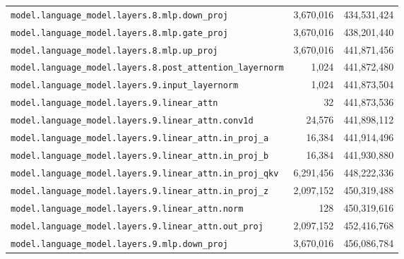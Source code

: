 \documentclass[10pt,a4paper]{article}
\theoremstyle{definition}
\begin{document}
\begin{appendices}
\begin{longtable}{p{9.5cm}rr}
\texttt{model.\allowbreak{}language\_model.\allowbreak{}layers.\allowbreak{}8.\allowbreak{}mlp.\allowbreak{}down\_proj} & 3,670,016 & 434,531,424 \\
\texttt{model.\allowbreak{}language\_model.\allowbreak{}layers.\allowbreak{}8.\allowbreak{}mlp.\allowbreak{}gate\_proj} & 3,670,016 & 438,201,440 \\
\texttt{model.\allowbreak{}language\_model.\allowbreak{}layers.\allowbreak{}8.\allowbreak{}mlp.\allowbreak{}up\_proj} & 3,670,016 & 441,871,456 \\
\texttt{model.\allowbreak{}language\_model.\allowbreak{}layers.\allowbreak{}8.\allowbreak{}post\_attention\_layernorm} & 1,024 & 441,872,480 \\
\texttt{model.\allowbreak{}language\_model.\allowbreak{}layers.\allowbreak{}9.\allowbreak{}input\_layernorm} & 1,024 & 441,873,504 \\
\texttt{model.\allowbreak{}language\_model.\allowbreak{}layers.\allowbreak{}9.\allowbreak{}linear\_attn} & 32 & 441,873,536 \\
\texttt{model.\allowbreak{}language\_model.\allowbreak{}layers.\allowbreak{}9.\allowbreak{}linear\_attn.\allowbreak{}conv1d} & 24,576 & 441,898,112 \\
\texttt{model.\allowbreak{}language\_model.\allowbreak{}layers.\allowbreak{}9.\allowbreak{}linear\_attn.\allowbreak{}in\_proj\_a} & 16,384 & 441,914,496 \\
\texttt{model.\allowbreak{}language\_model.\allowbreak{}layers.\allowbreak{}9.\allowbreak{}linear\_attn.\allowbreak{}in\_proj\_b} & 16,384 & 441,930,880 \\
\texttt{model.\allowbreak{}language\_model.\allowbreak{}layers.\allowbreak{}9.\allowbreak{}linear\_attn.\allowbreak{}in\_proj\_qkv} & 6,291,456 & 448,222,336 \\
\texttt{model.\allowbreak{}language\_model.\allowbreak{}layers.\allowbreak{}9.\allowbreak{}linear\_attn.\allowbreak{}in\_proj\_z} & 2,097,152 & 450,319,488 \\
\texttt{model.\allowbreak{}language\_model.\allowbreak{}layers.\allowbreak{}9.\allowbreak{}linear\_attn.\allowbreak{}norm} & 128 & 450,319,616 \\
\texttt{model.\allowbreak{}language\_model.\allowbreak{}layers.\allowbreak{}9.\allowbreak{}linear\_attn.\allowbreak{}out\_proj} & 2,097,152 & 452,416,768 \\
\texttt{model.\allowbreak{}language\_model.\allowbreak{}layers.\allowbreak{}9.\allowbreak{}mlp.\allowbreak{}down\_proj} & 3,670,016 & 456,086,784 \\

\end{longtable}
\end{appendices}
\end{document}
